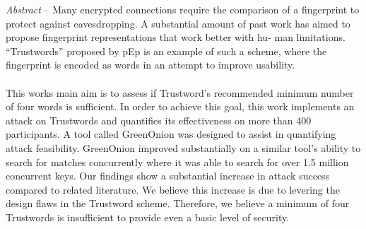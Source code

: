 \emph{Abstract} -- Many encrypted connections require the comparison of a fingerprint to
protect against eavesdropping. A substantial amount of past work has
aimed to propose fingerprint representations that work better with hu-
man limitations. ``Trustwords'' proposed by pEp is an example of such a
scheme, where the fingerprint is encoded as words in an attempt to improve
usability.
\\\\
This works main aim is to assess if Trustword’s recommended minimum
number of four words is sufficient. In order to achieve this goal, this work
implements an attack on Trustwords and quantifies its effectiveness on
more than 400 participants. A tool called GreenOnion was designed to
assist in quantifying attack feasibility. GreenOnion improved substantially
on a similar tool’s ability to search for matches concurrently where it was
able to search for over 1.5 million concurrent keys. Our findings show a
substantial increase in attack success compared to related literature. We
believe this increase is due to levering the design flaws in the Trustword
scheme. Therefore, we believe a minimum of four Trustwords is insufficient
to provide even a basic level of security.